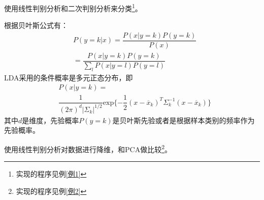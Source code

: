 \begin{Example}
	使用线性判别分析和二次判别分析来分类\footnote{实现的程序见例\ref{例1}}。

	根据贝叶斯公式有：
	\[
	\begin{aligned}
	&P(y=k|x)=\dfrac{P(x|y=k)P(y=k)}{P(x)}\\
	&=\dfrac{P(x|y=k)P(y=k)}{\sum\limits_l P(x|y=l)P(y=l)}
	\end{aligned}
	\]
	LDA采用的条件概率是多元正态分布，即
	\[
	\begin{aligned}
	&P(x|y=k)=\\
	&\dfrac{1}{(2\pi)^d\vert\Sigma_k\vert^{1/2}}\mathrm{exp}\{-\dfrac{1}{2}(x-\overline{x}_k)^T\Sigma^{-1}_k(x-\overline{x}_k)\}
	\end{aligned}
	\]
	其中$d$是维度，先验概率$P(y=k)$是贝叶斯先验或者是根据样本类别的频率作为先验概率。
\end{Example}

\begin{Example}
	使用线性判别分析对数据进行降维，和PCA做比较\footnote{实现的程序见例\ref{例2}}。
\end{Example}
